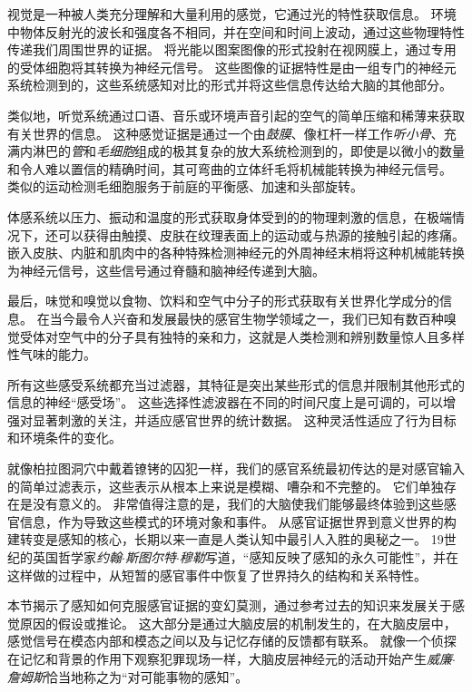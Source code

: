 视觉是一种被人类充分理解和大量利用的感觉，它通过光的特性获取信息。
环境中物体反射光的波长和强度各不相同，并在空间和时间上波动，通过这些物理特性传递我们周围世界的证据。
将光能以图案图像的形式投射在视网膜上，通过专用的受体细胞将其转换为神经元信号。
这些图像的证据特性是由一组专门的神经元系统检测到的，这些系统感知对比的形式并将这些信息传达给大脑的其他部分。


类似地，听觉系统通过口语、音乐或环境声音引起的空气的简单压缩和稀薄来获取有关世界的信息。
这种感觉证据是通过一个由\textit{鼓膜}、像杠杆一样工作\textit{听小骨}、充满内淋巴的\textit{管}和\textit{毛细胞}组成的极其复杂的放大系统检测到的，即使是以微小的数量和令人难以置信的精确时间，其可弯曲的立体纤毛将机械能转换为神经元信号。
类似的运动检测毛细胞服务于前庭的平衡感、加速和头部旋转。


体感系统以压力、振动和温度的形式获取身体受到的的物理刺激的信息，在极端情况下，还可以获得由触摸、皮肤在纹理表面上的运动或与热源的接触引起的疼痛。
嵌入皮肤、内脏和肌肉中的各种特殊检测神经元的外周神经末梢将这种机械能转换为神经元信号，这些信号通过脊髓和脑神经传递到大脑。


最后，味觉和嗅觉以食物、饮料和空气中分子的形式获取有关世界化学成分的信息。
在当今最令人兴奋和发展最快的感官生物学领域之一，我们已知有数百种嗅觉受体对空气中的分子具有独特的亲和力，这就是人类检测和辨别数量惊人且多样性气味的能力。


所有这些感受系统都充当过滤器，其特征是突出某些形式的信息并限制其他形式的信息的神经“感受场”。
这些选择性滤波器在不同的时间尺度上是可调的，可以增强对显著刺激的关注，并适应感官世界的统计数据。
这种灵活性适应了行为目标和环境条件的变化。


就像柏拉图洞穴中戴着镣铐的囚犯一样，我们的感官系统最初传达的是对感官输入的简单过滤表示，这些表示从根本上来说是模糊、嘈杂和不完整的。
它们单独存在是没有意义的。
非常值得注意的是，我们的大脑使我们能够最终体验到这些感官信息，作为导致这些模式的环境对象和事件。
从感官证据世界到意义世界的构建转变是感知的核心，长期以来一直是人类认知中最引人入胜的奥秘之一。
19世纪的英国哲学家\textit{约翰$\cdot$斯图尔特$\cdot$穆勒}写道，“感知反映了感知的永久可能性”，并在这样做的过程中，从短暂的感官事件中恢复了世界持久的结构和关系特性。


本节揭示了感知如何克服感官证据的变幻莫测，通过参考过去的知识来发展关于感觉原因的假设或推论。
这大部分是通过大脑皮层的机制发生的，在大脑皮层中，感觉信号在模态内部和模态之间以及与记忆存储的反馈都有联系。
就像一个侦探在记忆和背景的作用下观察犯罪现场一样，大脑皮层神经元的活动开始产生\textit{威廉$\cdot$詹姆斯}恰当地称之为“对可能事物的感知”。


